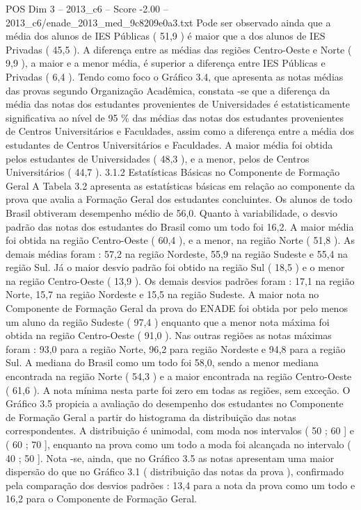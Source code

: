 \begin{textsample}{POS Dim 3 – 2013\_c6 – Score -2.00 – 2013\_c6/enade\_2013\_med\_9c8209e0a3.txt}
Pode ser observado ainda que a média dos alunos de IES Públicas ( 51,9 ) é maior que a dos alunos de IES Privadas ( 45,5 ).
A diferença entre as médias das regiões Centro-Oeste e Norte ( 9,9 ), a maior e a menor média, é superior a diferença entre IES Públicas e Privadas ( 6,4 ).
Tendo como foco o Gráfico 3.4, que apresenta as notas médias das provas segundo Organização Acadêmica, constata -se que a diferença da média das notas dos estudantes provenientes de Universidades é estatisticamente significativa ao nível de 95 \% das médias das notas dos estudantes provenientes de Centros Universitários e Faculdades, assim como a diferença entre a média dos estudantes de Centros Universitários e Faculdades.
A maior média foi obtida pelos estudantes de Universidades ( 48,3 ), e a menor, pelos de Centros Universitários ( 44,7 ). 3.1.2 Estatísticas Básicas no Componente de Formação Geral A Tabela 3.2 apresenta as estatísticas básicas em relação ao componente da prova que avalia a Formação Geral dos estudantes concluintes.
Os alunos de todo Brasil obtiveram desempenho médio de 56,0.
Quanto à variabilidade, o desvio padrão das notas dos estudantes do Brasil como um todo foi 16,2.
A maior média foi obtida na região Centro-Oeste ( 60,4 ), e a menor, na região Norte ( 51,8 ).
As demais médias foram : 57,2 na região Nordeste, 55,9 na região Sudeste e 55,4 na região Sul.
Já o maior desvio padrão foi obtido na região Sul ( 18,5 ) e o menor na região Centro-Oeste ( 13,9 ).
Os demais desvios padrões foram : 17,1 na região Norte, 15,7 na região Nordeste e 15,5 na região Sudeste.
A maior nota no Componente de Formação Geral da prova do ENADE foi obtida por pelo menos um aluno da região Sudeste ( 97,4 ) enquanto que a menor nota máxima foi obtida na região Centro-Oeste ( 91,0 ).
Nas outras regiões as notas máximas foram : 93,0 para a região Norte, 96,2 para região Nordeste e 94,8 para a região Sul.
A mediana do Brasil como um todo foi 58,0, sendo a menor mediana encontrada na região Norte ( 54,3 ) e a maior encontrada na região Centro-Oeste ( 61,6 ).
A nota mínima nesta parte foi zero em todas as regiões, sem exceção.
O Gráfico 3.5 propicia a avaliação do desempenho dos estudantes no Componente de Formação Geral a partir do histograma da distribuição das notas correspondentes.
A distribuição é unimodal, com moda nos intervalos ( 50 ; 60 ] e ( 60 ; 70 ], enquanto na prova como um todo a moda foi alcançada no intervalo ( 40 ; 50 ].
Nota -se, ainda, que no Gráfico 3.5 as notas apresentam uma maior dispersão do que no Gráfico 3.1 ( distribuição das notas da prova ), confirmado pela comparação dos desvios padrões : 13,4 para a nota da prova como um todo e 16,2 para o Componente de Formação Geral.

\end{textsample}
